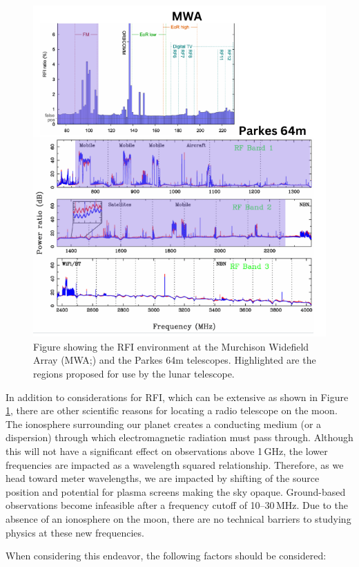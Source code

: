\begin{figure}
    \centering
    \includegraphics[width=0.75\linewidth]{figures/RFI_Plot.png}
    \caption{Figure showing the RFI environment at the Murchison Widefield Array (MWA;\citealt{Offringa_RFI}) and the Parkes 64m \citep{Hobbs_2020} telescopes. Highlighted are the regions proposed for use by the lunar telescope. }
    \label{fig:RFI}
\end{figure}

In addition to considerations for RFI, which can be extensive as shown in Figure \ref{fig:RFI}, there are other scientific reasons for locating a radio telescope on the moon. The ionosphere surrounding our planet creates a conducting medium (or a dispersion) through which electromagnetic radiation must pass through. Although this will not have a significant effect on observations above 1\,GHz, the lower frequencies are impacted as a wavelength squared relationship. Therefore, as we head toward meter wavelengths, we are impacted by shifting of the source position and potential for plasma screens making the sky opaque. Ground-based observations become infeasible after a frequency cutoff of 10--30\,MHz. Due to the absence of an ionosphere on the moon, there are no technical barriers to studying physics at these new frequencies.

When considering this endeavor, the following factors should be considered:

